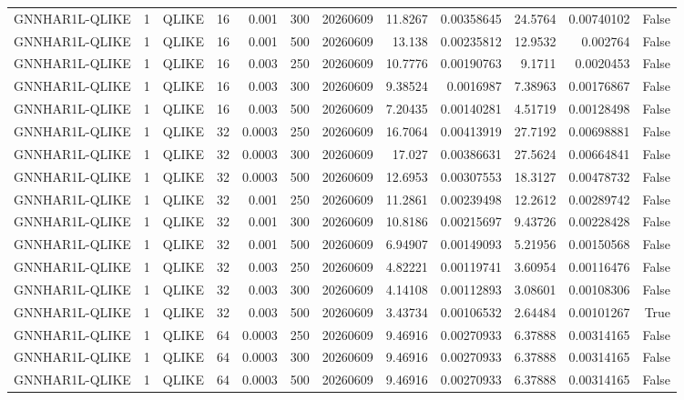 \begin{tabular}{lrlrrrrrrrrr}
GNNHAR1L-QLIKE & 1 & QLIKE & 16 & 0.001 & 300 & 20260609 & 11.8267 & 0.00358645 & 24.5764 & 0.00740102 & False \\
GNNHAR1L-QLIKE & 1 & QLIKE & 16 & 0.001 & 500 & 20260609 & 13.138 & 0.00235812 & 12.9532 & 0.002764 & False \\
GNNHAR1L-QLIKE & 1 & QLIKE & 16 & 0.003 & 250 & 20260609 & 10.7776 & 0.00190763 & 9.1711 & 0.0020453 & False \\
GNNHAR1L-QLIKE & 1 & QLIKE & 16 & 0.003 & 300 & 20260609 & 9.38524 & 0.0016987 & 7.38963 & 0.00176867 & False \\
GNNHAR1L-QLIKE & 1 & QLIKE & 16 & 0.003 & 500 & 20260609 & 7.20435 & 0.00140281 & 4.51719 & 0.00128498 & False \\
GNNHAR1L-QLIKE & 1 & QLIKE & 32 & 0.0003 & 250 & 20260609 & 16.7064 & 0.00413919 & 27.7192 & 0.00698881 & False \\
GNNHAR1L-QLIKE & 1 & QLIKE & 32 & 0.0003 & 300 & 20260609 & 17.027 & 0.00386631 & 27.5624 & 0.00664841 & False \\
GNNHAR1L-QLIKE & 1 & QLIKE & 32 & 0.0003 & 500 & 20260609 & 12.6953 & 0.00307553 & 18.3127 & 0.00478732 & False \\
GNNHAR1L-QLIKE & 1 & QLIKE & 32 & 0.001 & 250 & 20260609 & 11.2861 & 0.00239498 & 12.2612 & 0.00289742 & False \\
GNNHAR1L-QLIKE & 1 & QLIKE & 32 & 0.001 & 300 & 20260609 & 10.8186 & 0.00215697 & 9.43726 & 0.00228428 & False \\
GNNHAR1L-QLIKE & 1 & QLIKE & 32 & 0.001 & 500 & 20260609 & 6.94907 & 0.00149093 & 5.21956 & 0.00150568 & False \\
GNNHAR1L-QLIKE & 1 & QLIKE & 32 & 0.003 & 250 & 20260609 & 4.82221 & 0.00119741 & 3.60954 & 0.00116476 & False \\
GNNHAR1L-QLIKE & 1 & QLIKE & 32 & 0.003 & 300 & 20260609 & 4.14108 & 0.00112893 & 3.08601 & 0.00108306 & False \\
GNNHAR1L-QLIKE & 1 & QLIKE & 32 & 0.003 & 500 & 20260609 & 3.43734 & 0.00106532 & 2.64484 & 0.00101267 & True \\
GNNHAR1L-QLIKE & 1 & QLIKE & 64 & 0.0003 & 250 & 20260609 & 9.46916 & 0.00270933 & 6.37888 & 0.00314165 & False \\
GNNHAR1L-QLIKE & 1 & QLIKE & 64 & 0.0003 & 300 & 20260609 & 9.46916 & 0.00270933 & 6.37888 & 0.00314165 & False \\
GNNHAR1L-QLIKE & 1 & QLIKE & 64 & 0.0003 & 500 & 20260609 & 9.46916 & 0.00270933 & 6.37888 & 0.00314165 & False \\

\end{tabular}
